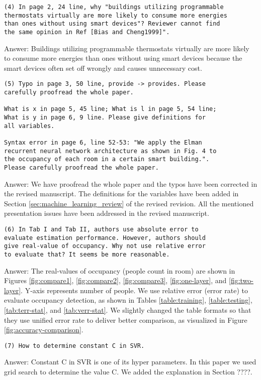 \begin{verbatim}
(4) In page 2, 24 line, why "buildings utilizing programmable
thermostats virtually are more likely to consume more energies
than ones without using smart devices"? Reviewer cannot find
the same opinion in Ref [Bias and Cheng1999]".
\end{verbatim}
Answer: Buildings utilizing programmable
thermostats virtually are more likely to consume more energies than ones
without using smart devices because the smart devices often set off wrongly
and causes unnecessary cost.

\begin{verbatim}
(5) Typo in page 3, 50 line, provide -> provides. Please
carefully proofread the whole paper.

What is x in page 5, 45 line; What is l in page 5, 54 line;
What is y in page 6, 9 line. Please give definitions for
all variables.

Syntax error in page 6, line 52-53: "We apply the Elman
recurrent neural network architecture as shown in Fig. 4 to
the occupancy of each room in a certain smart building.".
Please carefully proofread the whole paper.
\end{verbatim}
Answer: We have proofread the whole paper and the typos have been corrected in
the revised manuscript. The definitions for the variables have been added in
Section \ref{sec:machine_learning_review} of the revised revision. All the mentioned presentation issues have
been addressed in the revised manuscript.

\begin{verbatim}
(6) In Tab I and Tab II, authors use absolute error to
evaluate estimation performance. However, authors should
give real-value of occupancy. Why not use relative error
to evaluate that? It seems be more reasonable.
\end{verbatim}
Answer: The real-values of occupancy (people count in room) are shown in Figures
\ref{fig:compare1}, \ref{fig:compare2}, \ref{fig:compare3},
\ref{fig:one-layer}, and \ref{fig:two-layer}. Y-axis represents number of
people. We use relative error (error rate) to evaluate occupancy detection, as
shown in Tables \ref{table:training}, \ref{table:testing}, \ref{tab:terr-stat},
and \ref{tab:verr-stat}. We slightly changed the table formats so that they use
unified error rate to deliver better comparison, as visualized in Figure
\ref{fig:accuracy-comparison}.

\begin{verbatim}
(7) How to determine constant C in SVR.
\end{verbatim}
Answer: Constant C in SVR is one of its hyper parameters. In this paper we used
grid search to determine the value C. We added the explanation in Section ????.

